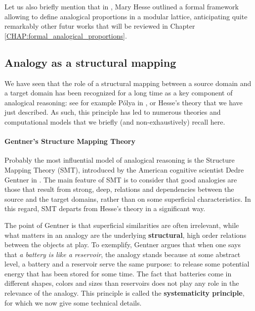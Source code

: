 Let us also briefly mention that in \cite{Hes59}, Mary Hesse outlined a formal
framework allowing to define analogical proportions in a modular lattice,
anticipating quite remarkably other futur works that will be reviewed in
Chapter \ref{CHAP:formal_analogical_proportions}.

\subsection{Analogy as a structural mapping}

We have seen that the role of a structural mapping between a source domain and
a target domain has been recognized for a long time as a key component of
analogical reasoning: see for example P\'olya in \cite{Pol54}, or Hesse's
theory that we have just described. As such, this principle has led to numerous
theories and computational models that we briefly (and non-exhaustively) recall
here.

\paragraph{Gentner's Structure Mapping Theory\\}

Probably the most influential model of analogical reasoning is the Structure
Mapping Theory (SMT), introduced by the American cognitive scientist Dedre
Gentner in \cite{Gen83}. The main feature of SMT is to consider that good
analogies are those that result from strong, deep, relations and dependencies
between the source and the target domains, rather than on some superficial
characteristics. In this regard, SMT departs from Hesse's theory in a
significant way.

The point of Gentner is that superficial similarities are often irrelevant,
while what matters in an analogy are the underlying \textbf{structural}, high
order relations between the objects at play. To exemplify, Gentner argues that
when one says that \textit{a battery is like a reservoir}, the analogy stands
because at some abstract level, a battery and a reservoir serve the same
purpose: to release some potential energy that has been stored for some time.
The fact that batteries come in different shapes, colors and sizes than
reservoirs does not play any role in the relevance of the analogy. This
principle is called the \textbf{systematicity principle}, for which we now give
some technical details.

